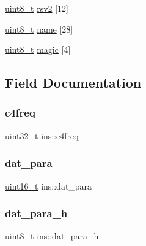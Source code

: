 \begin{DoxyCompactItemize}
\item 
\hyperlink{inttypes_8h_aba7bc1797add20fe3efdf37ced1182c5}{uint8\+\_\+t} \hyperlink{structins_af7e0a78e5b2330fd23f12476acb565bd}{rsv2} \mbox{[}12\mbox{]}
\item 
\hyperlink{inttypes_8h_aba7bc1797add20fe3efdf37ced1182c5}{uint8\+\_\+t} \hyperlink{structins_afbb6d56eec86ac3dfa63479b2f90aec6}{name} \mbox{[}28\mbox{]}
\item 
\hyperlink{inttypes_8h_aba7bc1797add20fe3efdf37ced1182c5}{uint8\+\_\+t} \hyperlink{structins_a0e5c0ef6dffb9606d72b2c2b33eb06c8}{magic} \mbox{[}4\mbox{]}
\end{DoxyCompactItemize}


\subsection{Field Documentation}
\mbox{\label{structins_ad71d3ef90ec69fab3a86e12aa43f8834}} 
\subsubsection{\texorpdfstring{c4freq}{c4freq}}
{\footnotesize\ttfamily \hyperlink{inttypes_8h_a435d1572bf3f880d55459d9805097f62}{uint32\+\_\+t} ins\+::c4freq}

\mbox{\label{structins_a25418cae7f447c093d72ed50df903e2d}} 
\subsubsection{\texorpdfstring{dat\+\_\+para}{dat\_para}}
{\footnotesize\ttfamily \hyperlink{inttypes_8h_a273cf69d639a59973b6019625df33e30}{uint16\+\_\+t} ins\+::dat\+\_\+para}

\mbox{\label{structins_a4d0d131346ce3ba1f85b51b1b4bc0357}} 
\subsubsection{\texorpdfstring{dat\+\_\+para\+\_\+h}{dat\_para\_h}}
{\footnotesize\ttfamily \hyperlink{inttypes_8h_aba7bc1797add20fe3efdf37ced1182c5}{uint8\+\_\+t} ins\+::dat\+\_\+para\+\_\+h}

